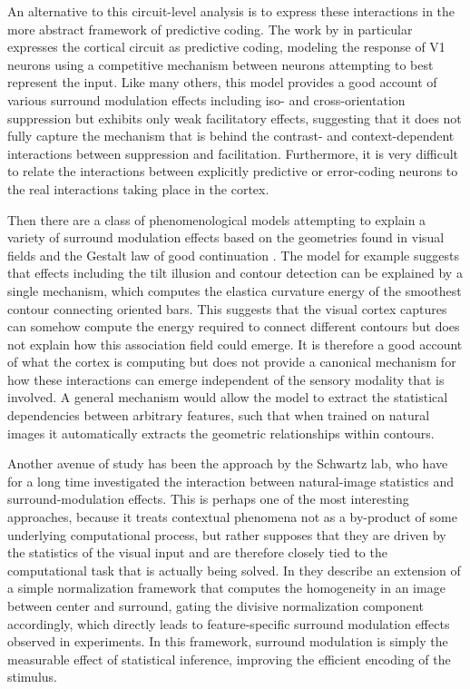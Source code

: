 An alternative to this circuit-level analysis is to express these
interactions in the more abstract framework of predictive coding. The
work by \cite{Spratling2010} in particular expresses the cortical
circuit as predictive coding, modeling the response of V1 neurons
using a competitive mechanism between neurons attempting to best
represent the input. Like many others, this model provides a good
account of various surround modulation effects including iso- and
cross-orientation suppression but exhibits only weak facilitatory
effects, suggesting that it does not fully capture the mechanism that
is behind the contrast- and context-dependent interactions between
suppression and facilitation. Furthermore, it is very difficult to
relate the interactions between explicitly predictive or error-coding
neurons to the real interactions taking place in the cortex.

Then there are a class of phenomenological models attempting to
explain a variety of surround modulation effects based on the
geometries found in visual fields and the Gestalt law of good
continuation \citep{Field1993}. The \cite{Keemink2015} model for
example suggests that effects including the tilt illusion and contour
detection can be explained by a single mechanism, which computes the
elastica curvature energy of the smoothest contour connecting oriented
bars. This suggests that the visual cortex captures can somehow
compute the energy required to connect different contours but does not
explain how this association field could emerge. It is therefore a
good account of what the cortex is computing but does not provide a
canonical mechanism for how these interactions can emerge independent
of the sensory modality that is involved. A general mechanism would
allow the model to extract the statistical dependencies between
arbitrary features, such that when trained on natural images it
automatically extracts the geometric relationships within contours.

Another avenue of study has been the approach by the Schwartz lab, who
have for a long time investigated the interaction between
natural-image statistics and surround-modulation effects. This is
perhaps one of the most interesting approaches, because it treats
contextual phenomena not as a by-product of some underlying
computational process, but rather supposes that they are driven by the
statistics of the visual input and are therefore closely tied to the
computational task that is actually being solved. In \cite{Coen2015}
they describe an extension of a simple normalization framework that
computes the homogeneity in an image between center and surround,
gating the divisive normalization component accordingly, which
directly leads to feature-specific surround modulation effects
observed in experiments. In this framework, surround modulation is
simply the measurable effect of statistical inference, improving the
efficient encoding of the stimulus.

